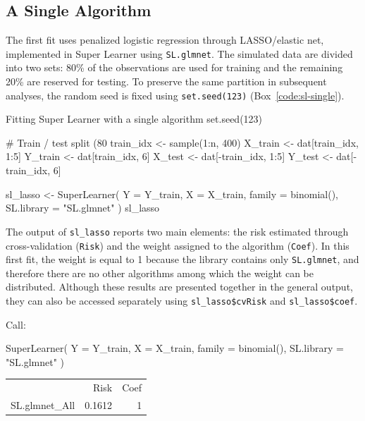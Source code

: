 \documentclass[12pt]{article}
\begin{document}
\subsection{A Single Algorithm}

The first fit uses penalized logistic regression through LASSO/elastic net, implemented 
in Super Learner using \texttt{SL.glmnet}. The simulated data are divided into two sets: 
80\% of the observations are used for training and the remaining 20\% are reserved for 
testing. To preserve the same partition in subsequent analyses, the random seed is fixed 
using \texttt{set.seed(123)} (Box~\ref{code:sl-single}).

\begin{rcode}[label={code:sl-single}]{Fitting Super Learner with a single algorithm}
set.seed(123)

# Train / test split (80 %
train_idx <- sample(1:n, 400)
X_train   <- dat[train_idx, 1:5]
Y_train   <- dat[train_idx, 6]
X_test    <- dat[-train_idx, 1:5]
Y_test    <- dat[-train_idx, 6]

sl_lasso <- SuperLearner(
  Y = Y_train, X = X_train,
  family = binomial(),
  SL.library = "SL.glmnet"
)
sl_lasso
\end{rcode}

The output of \texttt{sl\_lasso} reports two main elements: the risk estimated through 
cross-validation (\texttt{Risk}) and the weight assigned to the algorithm (\texttt{Coef}). 
In this first fit, the weight is equal to 1 because the library contains only 
\texttt{SL.glmnet}, and therefore there are no other algorithms among which the weight 
can be distributed. Although these results are presented together in the general output, 
they can also be accessed separately using \texttt{sl\_lasso\$cvRisk} and 
\texttt{sl\_lasso\$coef}.

\begin{routputboxref}[label={box:sl-single}]
	\ttfamily
	\raggedright
	
	Call:
	
	SuperLearner(
	Y = Y\_train,
	X = X\_train,
	family = binomial(),
	SL.library = "SL.glmnet"
	)
	
	\medskip
	
	\centering
	\begin{tabular}{lrr}
		& Risk & Coef \\
		SL.glmnet\_All & 0.1612 & 1 \\
	\end{tabular}
\end{routputboxref}
\end{document}
